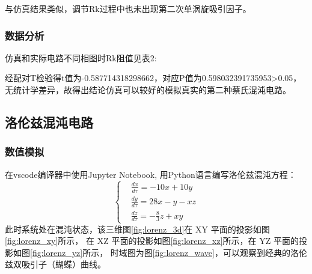 \documentclass[10pt,a4paper,twoside,UTF8]{ctexart}
\begin{document}
与仿真结果类似，调节Rk过程中也未出现第二次单涡旋吸引因子。

\subsubsection*{数据分析}
仿真和实际电路不同相图时Rk阻值见表2:

\begin{table}[H]
	\caption{仿真和实际电路不同相图时Rk阻值（单位：$\Omega$）}
	\label{tab:2}%
\end{table}%

经配对T检验得t值为-0.587714318298662，对应P值为0.598032391735953>0.05，无统计学差异，故得出结论仿真可以较好的模拟真实的第二种蔡氏混沌电路。

\subsection{洛伦兹混沌电路}
\subsubsection{数值模拟}

在vscode编译器中使用Jupyter Notebook, 用Python语言编写洛伦兹混沌方程：
\[\left\{
\begin{aligned}
&\frac{dx}{d\tau}=-10x+10y \\
&\frac{dy}{d\tau}=28x-y-xz \\
&\frac{dz}{d\tau}=-\frac{8}{3}z+xy
\end{aligned}
\right.
\]
此时系统处在混沌状态，该三维图\ref{fig:lorenz_3d}在 XY 平面的投影如图\ref{fig:lorenz_xy}所示，
在 XZ 平面的投影如图\ref{fig:lorenz_xz}所示，在 YZ 平面的投影如图\ref{fig:lorenz_yz}所示，
时域图为图\ref{fig:lorenz_wave}，可以观察到经典的洛伦兹双吸引子（蝴蝶）曲线。
\end{document}
